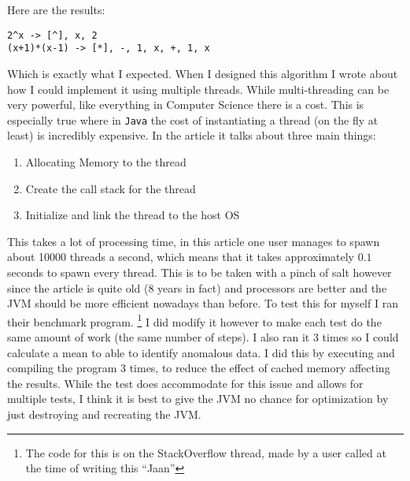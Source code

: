 \documentclass[../../../../main.tex]{subfiles}
\begin{document}
Here are the results:
\begin{verbatim}
2^x -> [^], x, 2
(x+1)*(x-1) -> [*], -, 1, x, +, 1, x
\end{verbatim}
Which is exactly what I expected.
\newpage
When I designed this algorithm I wrote about how I could implement it using multiple threads. While multi-threading can be very powerful, like everything in Computer Science there is a cost. This is especially true where in \texttt{Java} the cost of instantiating a thread\cite{threadCreationJava} (on the fly at least) is incredibly expensive. In the article it talks about three main things:
\begin{enumerate}
\item Allocating Memory to the thread
\item Create the call stack for the thread\cite{threadStackJava, callStack}
\item Initialize and link the thread to the host OS
\end{enumerate}
This takes a lot of processing time, in this article\cite{threadCreationRate} one user manages to spawn about 10000 threads a second, which means that it takes approximately $0.1$ seconds to spawn every thread. This is to be taken with a pinch of salt however since the article is quite old (8 years in fact) and processors are better and the JVM should be more efficient nowadays than before. To test this for myself I ran their benchmark program.
\footnote{The code for this is on the StackOverflow thread, made by a user called at the time of writing this ``Jaan''\cite{threadCreationRate}} 
I did modify it however to make each test do the same amount of work (the same number of steps). I also ran it 3 times so I could calculate a mean to able to identify anomalous data. I did this by executing and compiling the program 3 times, to reduce the effect of cached memory affecting the results. While the test does accommodate for this issue and allows for multiple tests, I think it is best to give the JVM no chance for optimization by just destroying and recreating the JVM.

\newpage
\end{document}
